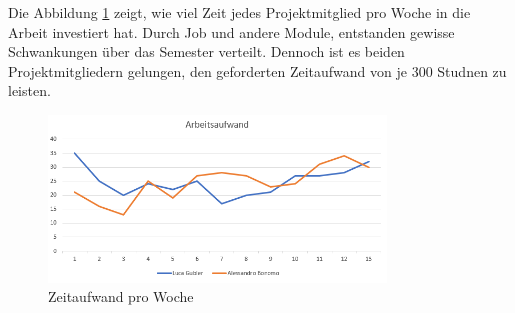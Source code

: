 Die Abbildung \ref{time_per_Week} zeigt, wie viel Zeit jedes Projektmitglied pro Woche in die Arbeit investiert hat. Durch Job und andere Module, entstanden gewisse Schwankungen über das Semester verteilt. Dennoch ist es beiden Projektmitgliedern gelungen, den geforderten Zeitaufwand von je 300 Studnen zu leisten.

	\begin{figure}[H]
				\begin{center}
\includegraphics[width=0.8\textwidth, height=\textheight, keepaspectratio]{images/Zeitauswertung/Aufwand_Wochen.png}
		\caption{Zeitaufwand pro Woche}
		\label{time_per_Week}
		\end{center}		
\end{figure}


